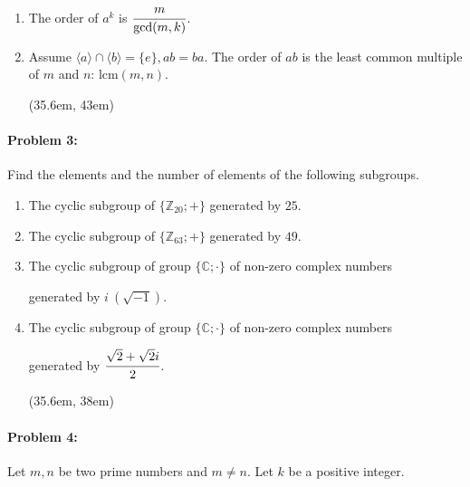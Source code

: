 \documentclass[12pt]{scrartcl}
\begin{document}
{{\vspace{-0.5em}
\begin{enumerate}[label=(\alph*)]
	\item The order of $a^k$ is $\cfrac{m}{\text{gcd}(m, k)}$.
	\item \begin{spacing}{1.5} Assume $\langle a \rangle \cap \langle b \rangle = \{e\}, ab = ba.$ The order of $ab$ is the least common multiple of $m$ and $n$: $\text{lcm}(m,n)$.\end{spacing}

	\vspace{0.5em} 
	\framebox(35.6em, 43em){}

\end{enumerate}


\paragraph*{Problem 3: }\begin{spacing}{1.2}Find the elements and the number of elements of the following subgroups.


\begin{enumerate}[label=(\alph*)]
\item  The cyclic subgroup of $\{\mathbb{Z}_{20}; +\}$ generated by $25$.

\vspace{0.25em} 
\item The cyclic subgroup of $\{\mathbb{Z}_{63}; +\}$ generated by $49$.

\vspace{0.25em} 
\item The cyclic subgroup of group $\{\mathbb{C}; \cdot\}$ of non-zero complex numbers 

generated by $i ~(\sqrt{-1})$.

\vspace{0.3em} 
\item The cyclic subgroup of group $\{\mathbb{C}; \cdot\}$ of non-zero complex numbers 

generated by $\cfrac{\sqrt{2}+\sqrt{2}i}{2}$.

\vspace{0.3em} 
\framebox(35.6em, 38em){}


\end{enumerate}

\end{spacing}


\paragraph*{Problem 4: }\begin{spacing}{1.5}Let $m, n$ be two prime numbers and $m \neq n$. Let $k$ be a positive integer. 


\end{spacing}}}
\end{document}
